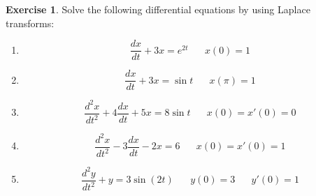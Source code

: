 \documentclass{report}
\theoremstyle{definition}
\newtheorem{exercise}{Exercise}[chapter]
\theoremstyle{remark}
\newcommand{\twen}{\hspace{20pt}}
\newcommand{\od}[2]{\frac{d #1}{d#2}}
\newcommand{\odt}[2]{\frac{d^2 #1}{d#2^2}}
\begin{document}
\begin{exercise}
    Solve the following differential equations by using Laplace transforms:
    \begin{enumerate}[label=(\alph*)]
        \item \begin{equation*}
            \od{x}{t} + 3x = e^{2t} \twen x(0)=1
        \end{equation*}
        \item \begin{equation*}
            \od{x}{t} + 3x = \sin t \twen x(\pi)=1
        \end{equation*}
        \item \begin{equation*}
            \odt{x}{t} +4\od{x}{t}+5x=8 \sin t \twen x(0)=x'(0)=0 
        \end{equation*}
        \item \begin{equation*}
            \odt{x}{t} -3\od{x}{t} -2x =6 \twen x(0) = x'(0) = 1 
        \end{equation*}
        \item \begin{equation*}
            \odt{y}{t} + y = 3 \sin (2t) \twen y(0)=3 \twen y'(0)=1
        \end{equation*}
    \end{enumerate}
\end{exercise}
\end{document}
